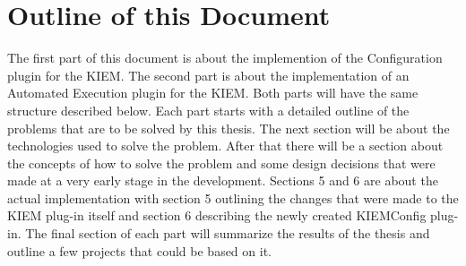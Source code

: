 \section{Outline of this Document}
\label{sec:intro/Outline}
The first part of this document is about the implemention of the Configuration plugin for the \ac{KIEM}.
The second part is about the implementation of an Automated Execution plugin for the \ac{KIEM}. Both
parts will have the same structure described below.
Each part starts with a detailed outline of the problems that are to be solved by this thesis.
The next section will be about the technologies used to solve the problem.
After that there will be a section about the concepts of how to solve the problem and some
design decisions that were made at a very early stage in the development.
Sections 5 and 6 are about the actual implementation with section 5 outlining the changes
that were made to the \ac{KIEM} plug-in itself and section 6 describing the newly created
\ac{KIEMConfig} plug-in.
The final section of each part will summarize the results of the thesis and outline
a few projects that could be based on it.









